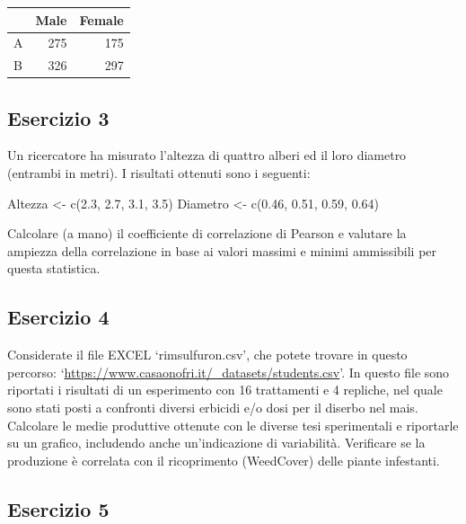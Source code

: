 \documentclass[a4paper,12pt,oneside]{book}
\newenvironment{Shaded}{\begin{snugshade}}{\end{snugshade}}
\newcommand{\FloatTok}[1]{#1}
\newcommand{\OtherTok}[1]{#1}
\newcommand{\FunctionTok}[1]{#1}
\newcommand{\NormalTok}[1]{#1}
\begin{document}
\begin{tabular}{l|r|r}
\hline
  & Male & Female\\
\hline
A & 275 & 175\\
\hline
B & 326 & 297\\
\hline
\end{tabular}

\hypertarget{esercizio-3-1}{%
\subsection{Esercizio 3}\label{esercizio-3-1}}

Un ricercatore ha misurato l'altezza di quattro alberi ed il loro diametro (entrambi in metri). I risultati ottenuti sono i seguenti:

\begin{Shaded}
\begin{Highlighting}[]
\NormalTok{Altezza }\OtherTok{\textless{}{-}} \FunctionTok{c}\NormalTok{(}\FloatTok{2.3}\NormalTok{, }\FloatTok{2.7}\NormalTok{, }\FloatTok{3.1}\NormalTok{, }\FloatTok{3.5}\NormalTok{)}
\NormalTok{Diametro }\OtherTok{\textless{}{-}} \FunctionTok{c}\NormalTok{(}\FloatTok{0.46}\NormalTok{, }\FloatTok{0.51}\NormalTok{, }\FloatTok{0.59}\NormalTok{, }\FloatTok{0.64}\NormalTok{)}
\end{Highlighting}
\end{Shaded}

Calcolare (a mano) il coefficiente di correlazione di Pearson e valutare la ampiezza della correlazione in base ai valori massimi e minimi ammissibili per questa statistica.

\hypertarget{esercizio-4-1}{%
\subsection{Esercizio 4}\label{esercizio-4-1}}

Considerate il file EXCEL `rimsulfuron.csv', che potete trovare in questo percorso: `\url{https://www.casaonofri.it/_datasets/students.csv}'. In questo file sono riportati i risultati di un esperimento con 16 trattamenti e 4 repliche, nel quale sono stati posti a confronti diversi erbicidi e/o dosi per il diserbo nel mais. Calcolare le medie produttive ottenute con le diverse tesi sperimentali e riportarle su un grafico, includendo anche un'indicazione di variabilità. Verificare se la produzione è correlata con il ricoprimento (WeedCover) delle piante infestanti.

\hypertarget{esercizio-5-1}{%
\subsection{Esercizio 5}\label{esercizio-5-1}}
\end{document}
